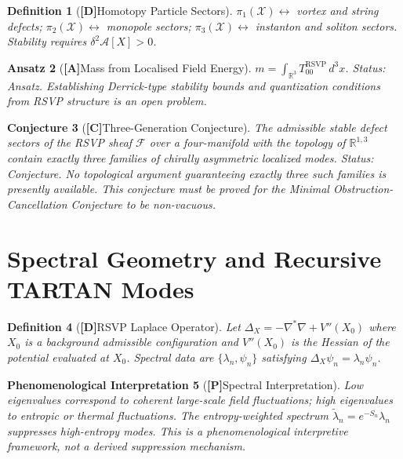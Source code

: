 \documentclass[12pt,a4paper]{article}
\newcommand{\claimD}{\textbf{[D]}\;}
\newcommand{\claimA}{\textbf{[A]}\;}
\newcommand{\claimC}{\textbf{[C]}\;}
\newcommand{\claimP}{\textbf{[P]}\;}
\newtheorem{defn}{Definition}[section]
\newtheorem{appansatz}[defn]{Ansatz}
\newtheorem{appconj}[defn]{Conjecture}
\newtheorem{appphen}[defn]{Phenomenological Interpretation}
\begin{document}
\begin{defn}[\claimD Homotopy Particle Sectors]
$\pi_1(\mathcal{X})\leftrightarrow$ vortex and string defects;
$\pi_2(\mathcal{X})\leftrightarrow$ monopole sectors;
$\pi_3(\mathcal{X})\leftrightarrow$ instanton and soliton sectors.
Stability requires $\delta^2\mathcal{A}[X] > 0$.
\end{defn}

\begin{appansatz}[\claimA Mass from Localised Field Energy]
$m = \int_{\mathbb{R}^3} T^{\mathrm{RSVP}}_{00}\,d^3x$.
\emph{Status: Ansatz.} Establishing Derrick-type stability bounds and
quantization conditions from RSVP structure is an open problem.
\end{appansatz}

\begin{appconj}[\claimC Three-Generation Conjecture]
The admissible stable defect sectors of the RSVP sheaf $\mathcal{F}$ over a
four-manifold with the topology of $\mathbb{R}^{1,3}$ contain exactly three
families of chirally asymmetric localized modes.
\emph{Status: Conjecture.} No topological argument guaranteeing exactly three
such families is presently available. This conjecture must be proved for the
Minimal Obstruction-Cancellation Conjecture to be non-vacuous.
\end{appconj}

\section{Spectral Geometry and Recursive TARTAN Modes}

\begin{defn}[\claimD RSVP Laplace Operator]
Let $\Delta_X = -\nabla^\ast\nabla + V''(X_0)$ where $X_0$ is a background
admissible configuration and $V''(X_0)$ is the Hessian of the potential
evaluated at $X_0$. Spectral data are $\{\lambda_n,\psi_n\}$ satisfying
$\Delta_X\psi_n = \lambda_n\psi_n$.
\end{defn}

\begin{appphen}[\claimP Spectral Interpretation]
Low eigenvalues correspond to coherent large-scale field fluctuations;
high eigenvalues to entropic or thermal fluctuations. The entropy-weighted
spectrum $\widetilde{\lambda}_n = e^{-S_n}\lambda_n$ suppresses high-entropy
modes. This is a phenomenological interpretive framework, not a derived
suppression mechanism.
\end{appphen}
\end{document}
